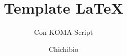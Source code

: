 \subject{Tipografia}
\title{Template \LaTeX}
\subtitle{Con KOMA-Script}
\author{Chichibio}
\date{\ISOToday ~ \thistime}

